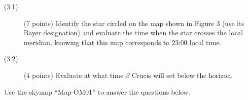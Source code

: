 
\begin{description}
\item[(3.1)] (7 points) Identify the star circled on the map shown in
  Figure 3 (use its Bayer designation) and evaluate the time when the star
  crosses the local meridian, knowing that this map corresponds to 23:00 local
  time.
\item[(3.2)] (4 points) Evaluate at what time $\beta$ Crucis will set below
  the horizon.
\end{description}

Use the skymap ``Map-OM01'' to answer the questions below.


